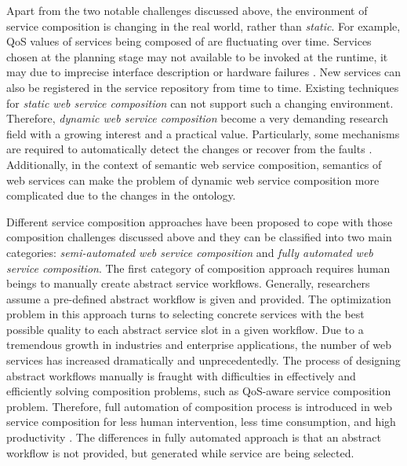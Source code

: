 Apart from the two notable challenges discussed above, the environment of service composition is changing in the real world, rather than \emph{static}. For example, QoS values of services being composed of are fluctuating over time. Services chosen at the planning stage may not available to be invoked at the runtime, it may due to imprecise interface description \cite{ishikawa2011bridging} or hardware failures \cite{guinard2009discovery}. New services can also be registered in the service repository from time to time. Existing techniques for \emph{static web service composition} can not support such a changing environment. Therefore, \emph{dynamic web service composition} become a very demanding research field with a growing interest and a practical value. Particularly, some mechanisms are required to automatically detect the changes or recover from the faults \cite{chan2009fault}. Additionally, in the context of semantic web service composition, semantics of web services can make the problem of dynamic web service composition more complicated due to the changes in the ontology.


Different service composition approaches \cite{da2016genetic,da2016particle,gupta2015optimization,lecue2009optimizing,ma2015hybrid,qi2010combining,rodriguez2010composition,yu2013adaptive,wang2014automated} have been proposed to cope with those composition challenges discussed above and they can be classified into two main categories: \emph{semi-automated web service composition} and \emph{fully automated web service composition}. The first category of composition approach requires human beings to manually create abstract service workflows. Generally, researchers assume a pre-defined abstract workflow is given and provided. The optimization problem in this approach turns to selecting concrete services with the best possible quality to each abstract service slot in a given workflow. Due to a tremendous growth in industries and enterprise applications, the number of web services has increased dramatically and unprecedentedly. The process of designing abstract workflows  manually is fraught with difficulties in effectively and efficiently solving composition problems, such as QoS-aware service composition problem. Therefore, full automation of composition process is introduced in web service composition for less human intervention, less time consumption, and high productivity \cite{rao2004survey}. The differences in fully automated approach is that an abstract workflow is not provided, but generated while service are being selected. 


